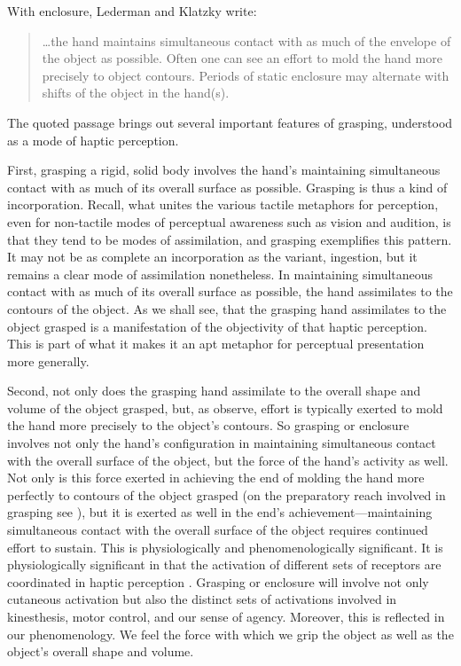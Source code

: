 With enclosure, Lederman and Klatzky write:
\begin{quote}
	\ldots the hand maintains simultaneous contact with as much of the envelope of the object as possible. Often one can see an effort to mold the hand more precisely to object contours. Periods of static enclosure may alternate with shifts of the object in the hand(s). \citep[346--7]{Lederman:1987fr}
\end{quote}
The quoted passage brings out several important features of grasping, understood as a mode of haptic perception. 

First, grasping a rigid, solid body involves the hand's maintaining simultaneous contact with as much of its overall surface as possible. Grasping is thus a kind of incorporation. Recall, what unites the various tactile metaphors for perception, even for non-tactile modes of perceptual awareness such as vision and audition, is that they tend to be modes of assimilation, and grasping exemplifies this pattern. It may not be as complete an incorporation as the variant, ingestion, but it remains a clear mode of assimilation nonetheless. In maintaining simultaneous contact with as much of its overall surface as possible, the hand assimilates to the contours of the object. As we shall see, that the grasping hand assimilates to the object grasped is a manifestation of the objectivity of that haptic perception. This is part of what it makes it an apt metaphor for perceptual presentation more generally.

Second, not only does the grasping hand assimilate to the overall shape and volume of the object grasped, but, as \citet{Lederman:1987fr} observe, effort is typically exerted to mold the hand more precisely to the object's contours. So grasping or enclosure involves not only the hand's configuration in maintaining simultaneous contact with the overall surface of the object, but the force of the hand's activity as well. Not only is this force exerted in achieving the end of molding the hand more perfectly to contours of the object grasped (on the preparatory reach involved in grasping see \citealt[chapter 6]{Jones:2006aa}), but it is exerted as well in the end's achievement---maintaining simultaneous contact with the overall surface of the object requires continued effort to sustain. This is physiologically and phenomenologically significant. It is physiologically significant in that the activation of different sets of receptors are coordinated in haptic perception \citep[see][chapter 3, for discussion]{Fulkerson:2014ek}. Grasping or enclosure will involve not only cutaneous activation but also the distinct sets of activations involved in kinesthesis, motor control, and our sense of agency. Moreover, this is reflected in our phenomenology. We feel the force with which we grip the object as well as the object's overall shape and volume.

